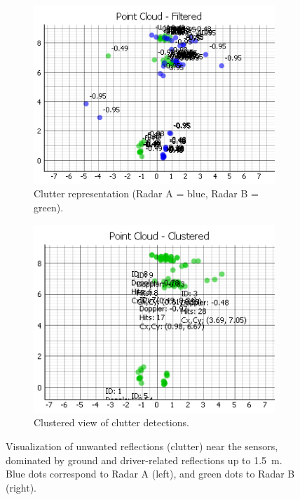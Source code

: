 \begin{figure}[!htbp]
    \centering
    \begin{subfigure}{0.45\linewidth}
        \centering
        \includegraphics[width=\linewidth]{images/dualSensorClutterYAxis.png}
        \caption{Clutter representation (Radar A = blue, Radar B = green).}
        \label{fig:clutter_representation}
    \end{subfigure}
    \hfill
    \begin{subfigure}{0.45\linewidth}
        \centering
        \includegraphics[width=\linewidth]{images/dualSensorClutterYAxisCluster.png}
        \caption{Clustered view of clutter detections.}
        \label{fig:clutter_clustered}
    \end{subfigure}
    \caption{Visualization of unwanted reflections (clutter) near the sensors, dominated by ground and driver-related reflections up to \SI{1.5}{\meter}.  
    Blue dots correspond to Radar A (left), and green dots to Radar B (right).}
    \label{fig:filter_example}
\end{figure}


\FloatBarrier